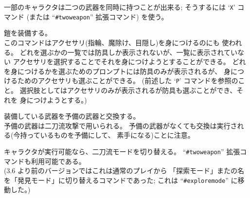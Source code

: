 一部のキャラクタは二つの武器を同時に持つことが出来る;
そうするには `{\tt X}' コマンド
(または ``{\tt \#twoweapon}'' 拡張コマンド) を使う。
\item[\tb{W}]
鎧を装備する。\\
このコマンドはアクセサリ(指輪、魔除け、目隠し)を身につけるのにも
使われる。
どれを選ぶかの一覧では防具しか表示されないが、一覧に表示されていない
アクセサリを選択することでそれを身につけようとすることができる。
どれを身につけるかを選ぶためのプロンプトには防具のみが表示されるが、
身につけるためのアクセサリも選ぶことができる。
(前述した `{\tt P}' コマンドを参照のこと。
選択肢としてはアクセサリのみが表示されるが防具も選ぶことができ、それを
身につけようとする。)
\item[\tb{x}]
装備している武器を予備の武器と交換する。\\
予備の武器は二刀流攻撃で用いられる。
予備の武器がなくても交換は実行される(今持っているものを予備にして、
素手になる)ことに注意。
\item[\tb{X}]
キャラクタが実行可能なら、二刀流モードを切り替える。
``{\tt \#twoweapon}'' 拡張コマンドも利用可能である。\\
(3.6 より前のバージョンではこれは通常のプレイから
「探索モード」またの名を「発見モード」に切り替えるコマンドであった;
これは ``{\tt \#exploremode}'' に移動した。)
\item[\tb{\^{}X}]
